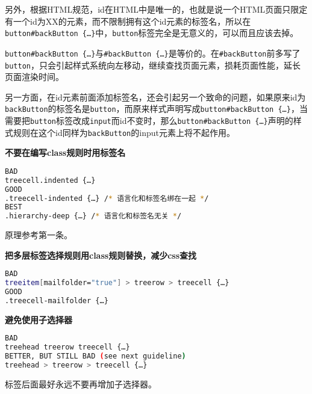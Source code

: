 另外，根据HTML规范，id在HTML中是唯一的，也就是说一个HTML页面只限定有一个id为XX的元素，而不限制拥有这个id元素的标签名，所以在\texttt{button\#backButton \{…\}}中，\texttt{button}标签完全是无意义的，可以而且应该去掉。

\texttt{button\#backButton \{…\}}与\texttt{\#backButton \{…\}}是等价的。在\texttt{\#backButton}前多写了\texttt{button}，只会引起样式系统向左移动，继续查找页面元素，损耗页面性能，延长页面渲染时间。

另一方面，在id元素前面添加标签名，还会引起另一个致命的问题，如果原来id为\texttt{backButton}的标签名是\texttt{button}，而原来样式声明写成\texttt{button\#backButton \{…\}}，当需要把\texttt{button}标签改成\texttt{input}而id不变时，那么\texttt{button\#backButton \{…\}}声明的样式规则在这个id同样为\texttt{backButton}的input元素上将不起作用。

\begin{compactenum}[2.]
\item \textbf{不要在编写class规则时用标签名}
\end{compactenum}

\begin{lstlisting}[language=bash]
BAD
treecell.indented {…}
GOOD
.treecell-indented {…} /* 语言化和标签名绑在一起 */
BEST
.hierarchy-deep {…} /* 语言化和标签名无关 */
\end{lstlisting}

原理参考第一条。

\begin{compactenum}[3.]
\item \textbf{把多层标签选择规则用class规则替换，减少css查找}
\end{compactenum}


\begin{lstlisting}[language=bash]
BAD
treeitem[mailfolder="true"] > treerow > treecell {…}
GOOD
.treecell-mailfolder {…}
\end{lstlisting}

\begin{compactenum}[4.]
\item \textbf{避免使用子选择器}
\end{compactenum}


\begin{lstlisting}[language=bash]
BAD
treehead treerow treecell {…}
BETTER, BUT STILL BAD (see next guideline)
treehead > treerow > treecell {…}
\end{lstlisting}

标签后面最好永远不要再增加子选择器。

